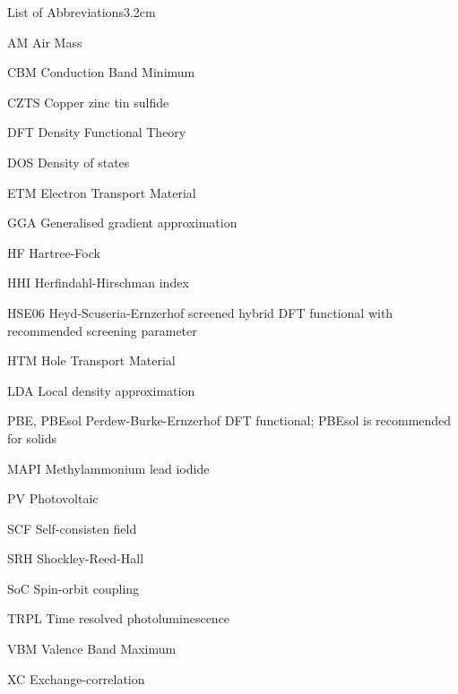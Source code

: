 \begin{mclistof}{List of Abbreviations}{3.2cm}

\item[AM] Air Mass
\item[CBM] Conduction Band Minimum
\item[CZTS] Copper zinc tin sulfide
\item[DFT] Density Functional Theory
\item[DOS] Density of states
\item[ETM] Electron Transport Material
\item[GGA] Generalised gradient approximation
\item[HF] Hartree-Fock
\item[HHI] Herfindahl-Hirschman index
\item[HSE06] Heyd-Scuseria-Ernzerhof screened hybrid DFT functional with recommended screening parameter
\item[HTM] Hole Transport Material
\item[LDA] Local density approximation
\item[PBE, PBEsol] Perdew-Burke-Ernzerhof DFT functional; PBEsol is recommended for solids
\item[MAPI] Methylammonium lead iodide
\item[PV] Photovoltaic
\item[SCF] Self-consisten field
\item[SRH] Shockley-Reed-Hall 
\item[SoC] Spin-orbit coupling
\item[TRPL] Time resolved photoluminescence
\item[VBM] Valence Band Maximum
\item[XC] Exchange-correlation

\end{mclistof} 

